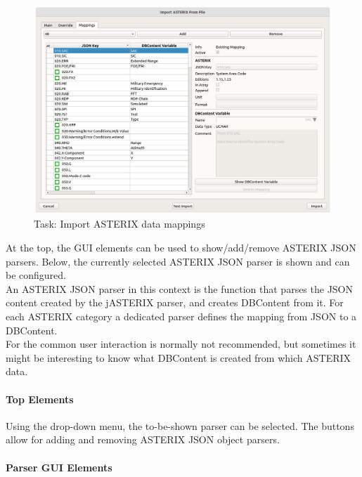 \begin{figure}[H]
  \center
    \hspace*{-0.5cm}
    \includegraphics[width=17cm]{figures/asterix_import_data_mappings.png}
  \caption{Task: Import ASTERIX data mappings}
\end{figure}

At the top, the GUI elements can be used to show/add/remove ASTERIX JSON parsers. Below, the currently selected ASTERIX JSON parser is shown and can be configured. \\

An ASTERIX JSON parser in this context is the function that parses the JSON content created by the jASTERIX parser, and creates DBContent from it. 
For each ASTERIX category a dedicated parser defines the mapping from JSON to a DBContent. \\

For the common user interaction is normally not recommended, but sometimes it might be interesting to know what DBContent is created from which ASTERIX data.

\paragraph{Top Elements}

Using the drop-down menu, the to-be-shown parser can be selected. The buttons allow for adding and removing ASTERIX JSON object parsers.

\paragraph{Parser GUI Elements}

